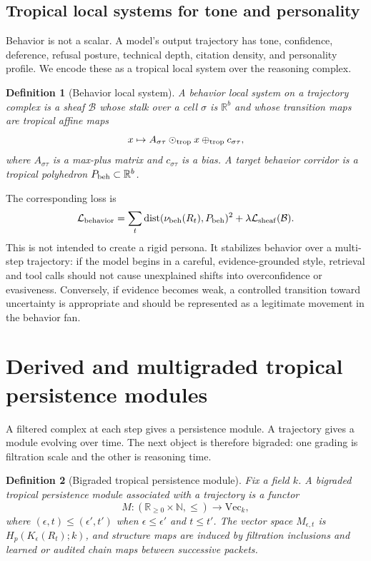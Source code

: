 \documentclass[11pt]{article}
\newtheorem{definition}{Definition}[section]
\newcommand{\R}{\mathbb{R}}
\newcommand{\N}{\mathbb{N}}
\newcommand{\calB}{\mathcal{B}}
\newcommand{\calL}{\mathcal{L}}
\newcommand{\oplusT}{\oplus_{\rm trop}}
\newcommand{\odotT}{\odot_{\rm trop}}
\newcommand{\dist}{\operatorname{dist}}
\begin{document}
\subsection{Tropical local systems for tone and personality}

Behavior is not a scalar.  A model's output trajectory has tone, confidence, deference, refusal posture, technical depth, citation density, and personality profile.  We encode these as a tropical local system over the reasoning complex.

\begin{definition}[Behavior local system]
A behavior local system on a trajectory complex is a sheaf \(\calB\) whose stalk over a cell \(\sigma\) is \(\R^b\) and whose transition maps are tropical affine maps
\begin{equation}
x\mapsto A_{\sigma\tau}\odotT x\oplusT c_{\sigma\tau},
\end{equation}
where \(A_{\sigma\tau}\) is a max-plus matrix and \(c_{\sigma\tau}\) is a bias.  A target behavior corridor is a tropical polyhedron \(P_{\rm beh}\subset\R^b\).
\end{definition}

The corresponding loss is
\begin{equation}
\calL_{\rm behavior}=\sum_t \dist(\nu_{\rm beh}(R_t),P_{\rm beh})^2+\lambda\calL_{\rm sheaf}(\calB).
\end{equation}
This is not intended to create a rigid persona.  It stabilizes behavior over a multi-step trajectory: if the model begins in a careful, evidence-grounded style, retrieval and tool calls should not cause unexplained shifts into overconfidence or evasiveness.  Conversely, if evidence becomes weak, a controlled transition toward uncertainty is appropriate and should be represented as a legitimate movement in the behavior fan.

\section{Derived and multigraded tropical persistence modules}

A filtered complex at each step gives a persistence module.  A trajectory gives a module evolving over time.  The next object is therefore bigraded: one grading is filtration scale and the other is reasoning time.

\begin{definition}[Bigraded tropical persistence module]
Fix a field \(k\).  A bigraded tropical persistence module associated with a trajectory is a functor
\begin{equation}
M:\left(\R_{\ge0}\times\N,\le\right)\to\mathrm{Vec}_k,
\end{equation}
where \((\epsilon,t)\le(\epsilon',t')\) when \(\epsilon\le\epsilon'\) and \(t\le t'\).  The vector space \(M_{\epsilon,t}\) is \(H_p(K_\epsilon(R_t);k)\), and structure maps are induced by filtration inclusions and learned or audited chain maps between successive packets.
\end{definition}
\end{document}
